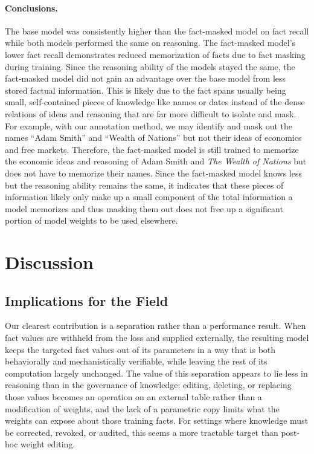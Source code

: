 \documentclass{article}
\begin{document}
\paragraph{Conclusions.}
The base model was consistently higher than the fact-masked model on fact recall while both models performed the same on reasoning. The fact-masked model's lower fact recall demonstrates reduced memorization of facts due to fact masking during training. Since the reasoning ability of the models stayed the same, the fact-masked model did not gain an advantage over the base model from less stored factual information. This is likely due to the fact spans usually being small, self-contained pieces of knowledge like names or dates instead of the dense relations of ideas and reasoning that are far more difficult to isolate and mask. For example, with our annotation method, we may identify and mask out the names ``Adam Smith'' and ``Wealth of Nations'' but not their ideas of economics and free markets. Therefore, the fact-masked model is still trained to memorize the economic ideas and reasoning of Adam Smith and \emph{The Wealth of Nations} but does not have to memorize their names. Since the fact-masked model knows less but the reasoning ability remains the same, it indicates that these pieces of information likely only make up a small component of the total information a model memorizes and thus masking them out does not free up a significant portion of model weights to be used elsewhere.

\FloatBarrier


\section{Discussion}

\subsection{Implications for the Field}

Our clearest contribution is a separation rather than a performance result. When fact values are withheld from the loss and supplied externally, the resulting model keeps the targeted fact values out of its parameters in a way that is both behaviorally and mechanistically verifiable, while leaving the rest of its computation largely unchanged. The value of this separation appears to lie less in reasoning than in the governance of knowledge: editing, deleting, or replacing those values becomes an operation on an external table rather than a modification of weights, and the lack of a parametric copy limits what the weights can expose about those training facts. For settings where knowledge must be corrected, revoked, or audited, this seems a more tractable target than post-hoc weight editing.
\end{document}
